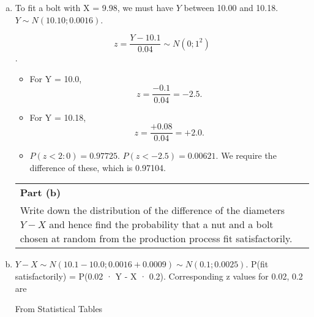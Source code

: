 \documentclass[a4paper,12pt]{article}
\begin{document}
\begin{enumerate}[(a)]
\item To fit a bolt with X = 9.98, we must have $Y$ between 10.00 and 10.18.
$Y \sim N(10.10; 0.0016)$. 

\[z = \frac{Y -10.1}{0.04} \sim N(0; 1^2)\].
\begin{itemize}
    \item For Y = 10.0, \[z = \frac{-0.1}{0.04} = -2.5.\]
\item For Y = 10.18, \[z = \frac{+0.08}{0.04} = +2.0.\]

\item $P(z < 2:0) = 0.97725$. $P(z < -2.5) = 0.00621$.
We require the difference of these, which is 0.97104.
\end{itemize}
\newpage
  \begin{table}[ht!]
     \centering
     \begin{tabular}{|p{15cm}|}
     \hline  
\noindent \textbf{Part (b)}\\Write down the distribution of the difference of the diameters $Y - X$ and hence find the probability that a nut and a bolt chosen at random from the production process fit satisfactorily.
\\ \hline
      \end{tabular}
    \end{table}
    
\item  $Y - X \sim N(10.1 - 10.0; 0.0016 + 0.0009) \sim N(0.1; 0.0025).$
P(fit satisfactorily) = P(0.02 · Y - X · 0.2). Corresponding z values for
0.02, 0.2 are 
From Statistical Tables


\end{enumerate}
\end{document}
